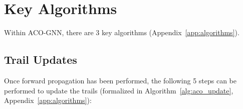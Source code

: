 \section[Key Algorithms]{Key Algorithms}
\label{sec:algorithms}

Within ACO-GNN, there are 3 key algorithms (Appendix~\ref{app:algorithms}).

\subsection{Trail Updates}
Once forward propagation has been performed, the following 5 steps can be performed to update the trails (formalized in Algorithm~\ref{alg:aco_update}, Appendix~\ref{app:algorithms}):

